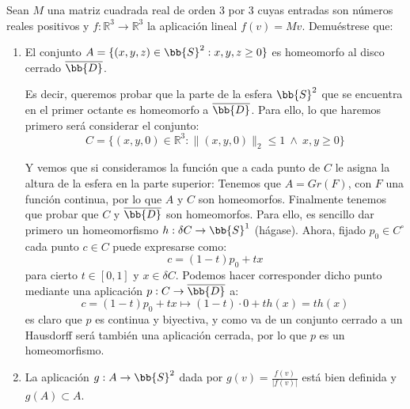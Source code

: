 \begin{ejercicio}
    Sean $M$ una matriz cuadrada real de orden 3 por 3 cuyas entradas son números reales positivos
    y $f:\mathbb{R}^3\to \mathbb{R}^3$ la aplicación lineal $f(v)=Mv$. Demuéstrese que:
    \begin{enumerate}[label=\alph*)]
        \item El conjunto $A=\{(x,y,z)\in \bb{S}^2:x,y,z\geq 0\}$ es homeomorfo al disco cerrado $\overline{\bb{D}}$.

            Es decir, queremos probar que la parte de la esfera $\bb{S}^2$ que se encuentra en el primer octante es homeomorfo a $\overline{\bb{D}}$. Para ello, lo que haremos primero será considerar el conjunto:
            \begin{equation*}
                C = \{(x,y,0)\in \mathbb{R}^3 : \|(x,y,0)\|_2 \leq 1 \ \land\  x,y\geq 0\}
            \end{equation*}
            \begin{figure}[H]
                \centering
            \end{figure}
            Y vemos que si consideramos la función que a cada punto de $C$ le asigna la altura de la esfera en la parte superior:
            Tenemos que $A = Gr(F)$, con $F$ una función continua, por lo que $A$ y $C$ son homeomorfos. Finalmente tenemos que probar que $C$ y $\overline{\bb{D}}$ son homeomorfos. Para ello, es sencillo dar primero un homeomorfismo $h:\delta C\to \bb{S}^1$ (hágase). Ahora, fijado $p_0\in C^\circ$ cada punto $c\in C$ puede expresarse como:
            \begin{equation*}
                c = (1-t)p_0 + tx
            \end{equation*}
            para cierto $t\in [0,1]$ y $x\in \delta C$. Podemos hacer corresponder dicho punto mediante una aplicación $p:C\to \overline{\bb{D}}$ a:
            \begin{equation*}
                c = (1-t)p_0 + tx \longmapsto (1-t)\cdot 0 + th(x) = th(x)
            \end{equation*}
            es claro que $p$ es continua y biyectiva, y como va de un conjunto cerrado a un Hausdorff será también una aplicación cerrada, por lo que $p$ es un homeomorfismo.
        \item La aplicación $g:A\to \bb{S}^2$ dada por $g(v) = \frac{f(v)}{|f(v)|}$ está bien definida y $g(A)\subset A$.


\end{enumerate}
\end{ejercicio}
